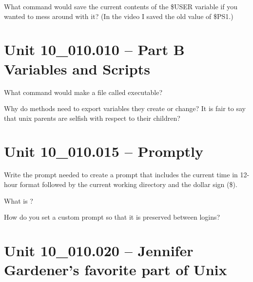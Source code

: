 \documentclass[letterpaper,12pt]{exam}
\newcommand{\unit}{Unit 10}
\begin{document}
\begin {questions}
\begin{samepage}
\question What command would save the current contents of the \$USER variable if you wanted to mess around with it? (In the video I saved the old value of \$PS1.) 
\vspace{5mm}
\end{samepage}

\section*{\unit\_010.010 -- Part B Variables and Scripts}

\begin{samepage}
\question What command would make a file called  executable? 
\vspace{5mm}
\end{samepage}

\begin{samepage}
\question Why do methods need to export variables they create or change?  It is fair to say that unix parents are selfish with respect to their children? 
\vspace{25mm}
\end{samepage}

\section*{\unit\_010.015 -- Promptly}

\begin{samepage}
\question Write the prompt needed to create a prompt that includes the current time in 12-hour format followed by the current working directory and the dollar sign (\$). 
\vspace{5mm}
\end{samepage}

\begin{samepage}
\question What is ? 
\vspace{15mm}
\end{samepage}

\begin{samepage}
\question How do you set a custom prompt so that it is preserved between logins? 
\end{samepage}

\section*{\unit\_010.020 -- Jennifer Gardener's favorite part of Unix}


\end{questions}
\end{document}
